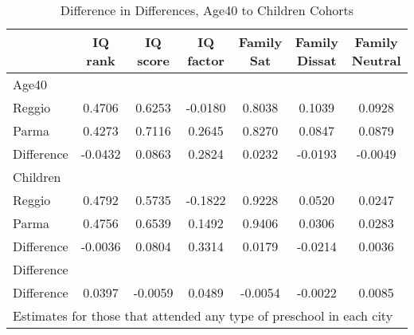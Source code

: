 \begin{table}[htbp]\centering
\caption{Difference in Differences, Age40 to Children Cohorts}
\begin{tabular}{l*{6}{c}}
\hline\hline
            &     IQ rank&    IQ score&   IQ factor&  Family Sat&Family Dissat&Family Neutral\\
\hline
Age40       &            &            &            &            &            &            \\
Reggio      &      0.4706&      0.6253&     -0.0180&      0.8038&      0.1039&      0.0928\\
Parma       &      0.4273&      0.7116&      0.2645&      0.8270&      0.0847&      0.0879\\
Difference  &     -0.0432&      0.0863&      0.2824&      0.0232&     -0.0193&     -0.0049\\
\hline
Children    &            &            &            &            &            &            \\
Reggio      &      0.4792&      0.5735&     -0.1822&      0.9228&      0.0520&      0.0247\\
Parma       &      0.4756&      0.6539&      0.1492&      0.9406&      0.0306&      0.0283\\
Difference  &     -0.0036&      0.0804&      0.3314&      0.0179&     -0.0214&      0.0036\\
\hline
Difference  &            &            &            &            &            &            \\
Difference  &      0.0397&     -0.0059&      0.0489&     -0.0054&     -0.0022&      0.0085\\
\hline\hline
\multicolumn{7}{l}{\footnotesize Estimates for those that attended any type of preschool in each city}\\
\end{tabular}
\end{table}
